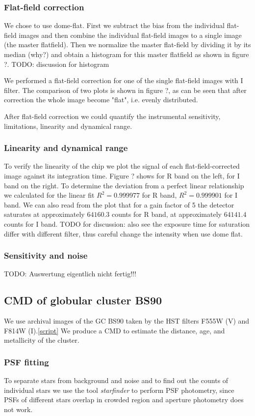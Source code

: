 \subsubsection{Flat-field correction}
We chose to use dome-flat. First we subtract the bias from the individual flat-field images and then combine the individual flat-field images to a single image (the master flatfield). Then we normalize the master flat-field by dividing it by its median (why?) and obtain a histogram for this master flatfield as shown in figure ?. TODO: discussion for histogram

We performed a flat-field correction for one of the single flat-field images with I filter. The comparison of two plots is shown in figure ?, as can be seen that after correction the whole image become "flat", i.e. evenly distributed. 

After flat-field correction we could quantify the instrumental sensitivity, limitations, linearity and dynamical range.
\subsubsection{Linearity and dynamical range}
To verify the linearity of the chip we plot the signal of each flat-field-corrected image against its integration time. Figure ? shows for R band on the left, for I band on the right. To determine the deviation from a perfect linear relationship we calculated for the linear fit $R^2 = 0.999977$ for R band, $R^2 = 0.999901$ for I band. We can also read from the plot that for a gain factor of 5 the detector saturates at approximately $64160.3$ counts for R band, at approximately $64141.4$ counts for I band.
TODO for discussion: also see the exposure time for saturation differ with different filter, thus careful change the intensity when use dome flat. 
\subsubsection{Sensitivity and noise}
TODO: Auswertung eigentlich nicht fertig!!!

\subsection{CMD of globular cluster BS90}
We use archival images of the GC BS90 taken by the HST filters F555W (V) and F814W (I).\ref{script} We produce a CMD to estimate the distance, age, and metallicity of the cluster.

\subsubsection{PSF fitting}
To separate stars from background and noise and to find out the counts of individual stars we use the tool  \textit{starfinder} to perform PSF photometry, since PSFs of different stars overlap in crowded region and aperture photometry does not work. 

